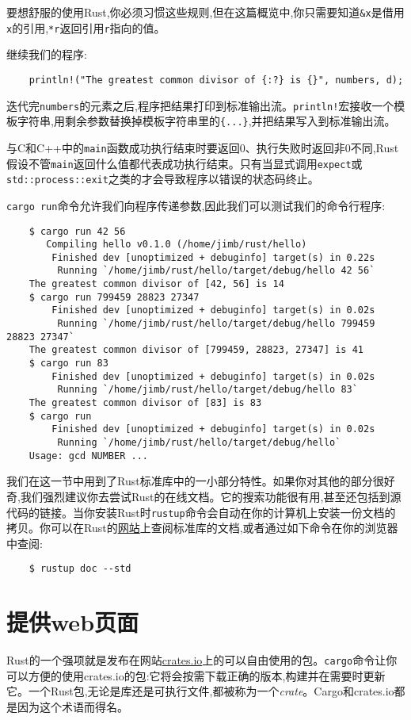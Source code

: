 要想舒服的使用Rust,你必须习惯这些规则,但在这篇概览中,你只需要知道\texttt{\&x}是借用\texttt{x}的引用,\texttt{*r}返回引用\texttt{r}指向的值。

继续我们的程序:
\begin{verbatim}
    println!("The greatest common divisor of {:?} is {}", numbers, d);
\end{verbatim}

迭代完\texttt{numbers}的元素之后,程序把结果打印到标准输出流。\texttt{println!}宏接收一个模板字符串,用剩余参数替换掉模板字符串里的\texttt{\{...\}},并把结果写入到标准输出流。

与C和C++中的\texttt{main}函数成功执行结束时要返回0、执行失败时返回非0不同,Rust假设不管\texttt{main}返回什么值都代表成功执行结束。只有当显式调用\texttt{expect}或\texttt{std::process::exit}之类的才会导致程序以错误的状态码终止。

\texttt{cargo run}命令允许我们向程序传递参数,因此我们可以测试我们的命令行程序:
\begin{verbatim}
    $ cargo run 42 56
       Compiling hello v0.1.0 (/home/jimb/rust/hello)
        Finished dev [unoptimized + debuginfo] target(s) in 0.22s
         Running `/home/jimb/rust/hello/target/debug/hello 42 56`
    The greatest common divisor of [42, 56] is 14
    $ cargo run 799459 28823 27347
        Finished dev [unoptimized + debuginfo] target(s) in 0.02s
         Running `/home/jimb/rust/hello/target/debug/hello 799459 28823 27347`
    The greatest common divisor of [799459, 28823, 27347] is 41
    $ cargo run 83
        Finished dev [unoptimized + debuginfo] target(s) in 0.02s
         Running `/home/jimb/rust/hello/target/debug/hello 83`
    The greatest common divisor of [83] is 83
    $ cargo run
        Finished dev [unoptimized + debuginfo] target(s) in 0.02s
         Running `/home/jimb/rust/hello/target/debug/hello`
    Usage: gcd NUMBER ...
\end{verbatim}

我们在这一节中用到了Rust标准库中的一小部分特性。如果你对其他的部分很好奇,我们强烈建议你去尝试Rust的在线文档。它的搜索功能很有用,甚至还包括到源代码的链接。当你安装Rust时\texttt{rustup}命令会自动在你的计算机上安装一份文档的拷贝。你可以在Rust的\href{https://www.rust-lang.org/learn}{网站}上查阅标准库的文档,或者通过如下命令在你的浏览器中查阅:
\begin{verbatim}
    $ rustup doc --std
\end{verbatim}

\section{提供web页面}
Rust的一个强项就是发布在网站\href{https://crates.io}{crates.io}上的可以自由使用的包。\texttt{cargo}命令让你可以方便的使用crates.io的包:它将会按需下载正确的版本,构建并在需要时更新它。一个Rust包,无论是库还是可执行文件,都被称为一个\emph{crate}。Cargo和crates.io都是因为这个术语而得名。

